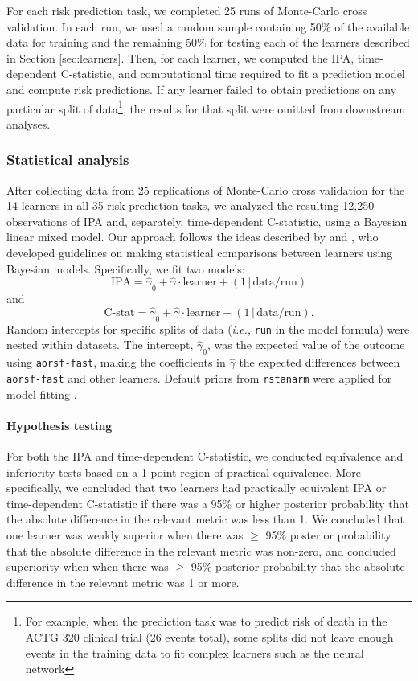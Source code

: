 \documentclass{article}\usepackage[]{graphicx}\usepackage[]{xcolor}
\newcommand{\ie}{\textit{i.e.}}
\newcommand{\secref}[1]{Section \ref{#1}}
\begin{document}
For each risk prediction task, we completed 25 runs of Monte-Carlo cross validation. In each run, we used a random sample containing 50\% of the available data for training and the remaining 50\% for testing each of the learners described in \secref{sec:learners}. Then, for each learner, we computed the IPA, time-dependent C-statistic, and computational time required to fit a prediction model and compute risk predictions. If any learner failed to obtain predictions on any particular split of data\footnote{For example, when the prediction task was to predict risk of death in the ACTG 320 clinical trial (26 events total), some splits did not leave enough events in the training data to fit complex learners such as the neural network}, the results for that split were omitted from downstream analyses.


\subsubsection{Statistical analysis}

After collecting data from 25 replications of Monte-Carlo cross validation for the 14 learners in all 35 risk prediction tasks, we analyzed the resulting 12,250 observations of IPA and, separately, time-dependent C-statistic, using a Bayesian linear mixed model. Our approach follows the ideas described by \citet{benavoli2017time} and \citet{tidymodels}, who developed guidelines on making statistical comparisons between learners using Bayesian models. Specifically, we fit two models: $$\text{IPA} = \widehat{\gamma}_0 + \widehat{\gamma} \cdot \text{learner} + (1\,|\, \text{data/run}) $$ and $$\text{C-stat} = \widehat{\gamma}_0 + \widehat{\gamma} \cdot \text{learner} + (1\,|\, \text{data/run}).$$ Random intercepts for specific splits of data (\ie, \texttt{run} in the model formula) were nested within datasets. The intercept, $\widehat{\gamma}_0$, was the expected value of the outcome using \texttt{aorsf-fast}, making the coefficients in $\widehat{\gamma}$ the expected differences between \texttt{aorsf-fast} and other learners. Default priors from \texttt{rstanarm} were applied for model fitting \citep{rstanarm}.

\paragraph{Hypothesis testing} For both the IPA and time-dependent C-statistic, we conducted equivalence and inferiority tests based on a 1 point region of practical equivalence. More specifically, we concluded that two learners had practically equivalent IPA or time-dependent C-statistic if there was a 95\% or higher posterior probability that the absolute difference in the relevant metric was less than 1. We concluded that one learner was weakly superior when there was $\geq$ 95\% posterior probability that the absolute difference in the relevant metric was non-zero, and concluded superiority when when there was $\geq$ 95\% posterior probability that the absolute difference in the relevant metric was 1 or more.
\end{document}
